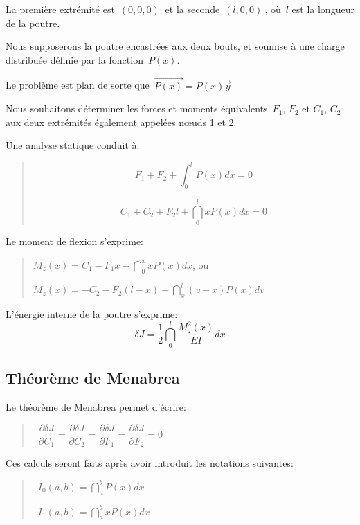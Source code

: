 La première extrémité est~$\left( 0,0,0\right)~$ et la seconde~$\left( l,0,0\right)~$, où~$l$ est la longueur de la poutre.

Nous supposerons la poutre encastrées aux deux bouts, et soumise à une charge distribuée définie par la fonction~$P(x)$.

Le problème est plan de sorte que~$\overrightarrow{P(x)} =P(x)\overrightarrow{y}$

Nous souhaitons déterminer les forces et moments équivalents~$F_1$, $F_2$ et $C_1$, $C_2$ aux deux extrémités également appelées nœuds 1 et 2.

\medskip
Une analyse statique conduit à:
\begin{quotation}
\begin{equation}
  \label{staticF}
  F_1+F_2+\int_0^l P(x)dx=0 
\end{equation}

\begin{equation}
  \label{staticC}
  C_1+C_2+F_2l+\dint_0^l x P(x)dx=0 
\end{equation}
\end{quotation}


\medskip
Le moment de flexion s'exprime:
\begin{quotation}
$M_z(x)=C_1-F_1x-\dint_0^x x P(x)dx$, ou

$M_z(x)=-C_2-F_2(l-x)-\dint_x^l(v-x) P(x)dv$
\end{quotation}

\medskip
L'énergie interne de la poutre s'exprime:
\[
\delta J=\frac 12\dint_0^l\dfrac{M_z^2(x)}{EI}dx
\]

\medskip
\subsection{Théorème de Menabrea}

Le théorème de Menabrea permet d'écrire:
\begin{quotation}
 ~$\dfrac{\partial \delta J}{\partial C_1} =
  \dfrac{\partial \delta J}{\partial C_2} =
  \dfrac{\partial \delta J}{\partial F_1} =
  \dfrac{\partial \delta J}{\partial F_2} = 0$
\end{quotation}

Ces calculs seront faits après avoir introduit les notations suivantes:
\begin{quotation}
 ~$I_0(a,b)=\dint_a^b P(x)dx$

 ~$I_1(a,b)=\dint_a^b x P(x)dx$
\end{quotation}


